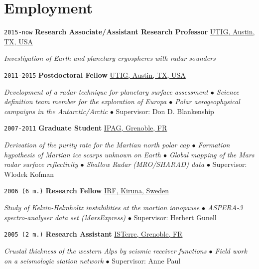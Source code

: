 
\section*{Employment}

\TabPositions{7em,32em}

\noindent \texttt{2015-now} \tab \textbf{Research Associate/Assistant Research Professor} \tab
\href{https://www.ig.utexas.edu/}{UTIG, Austin, TX, USA}
\begin{adjustwidth}{7em}{}
\textit{Investigation of Earth and planetary cryospheres with radar sounders}
\end{adjustwidth}
\vspace{.5em}

\noindent \texttt{2011-2015} \tab \textbf{Postdoctoral Fellow} \tab
\href{https://www.ig.utexas.edu/}{UTIG, Austin, TX, USA}
\begin{adjustwidth}{7em}{}
\textit{Development of a radar technique for planetary surface assessment $\bullet$ Science definition team member for the exploration of Europa $\bullet$ Polar aerogeophysical campaigns in the Antarctic/Arctic $\bullet$} Supervisor: Don D. Blankenship
\end{adjustwidth}
\vspace{.5em}

\noindent \texttt{2007-2011} \tab \textbf{Graduate Student} \tab
\href{http://ipag.osug.fr/}{IPAG, Grenoble, FR}
\vspace{.3em}
\begin{adjustwidth}{7em}{}
\textit{Derivation of the purity rate for the Martian north polar cap $\bullet$ Formation hypothesis of Martian ice scarps unknown on Earth $\bullet$ Global mapping of the Mars radar surface reflectivity $\bullet$ Shallow Radar (MRO/SHARAD) data $\bullet$} Supervisor: Wlodek Kofman
\end{adjustwidth}
\vspace{.5em}

\noindent \texttt{2006 (6 m.)} \tab \textbf{Research Fellow} \tab
\href{https://www2.irf.se/}{IRF, Kiruna, Sweden}
\vspace{.3em}
\begin{adjustwidth}{7em}{}
\textit{Study of Kelvin-Helmholtz instabilities at the martian ionopause $\bullet$ ASPERA-3 spectro-analyser data set (MarsExpress) $\bullet$} Supervisor: Herbert Gunell
\end{adjustwidth}
\vspace{.5em}

\noindent \texttt{2005 (2 m.)} \tab \textbf{Research Assistant} \tab
\href{https://www.isterre.fr/}{ISTerre, Grenoble, FR}
\vspace{.3em}
\begin{adjustwidth}{7em}{}
\textit{Crustal thickness of the western Alps by seismic receiver functions $\bullet$ Field work on a seismologic station network $\bullet$} Supervisor: Anne Paul
\end{adjustwidth}
\vspace{.5em}

